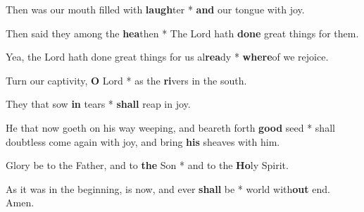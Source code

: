 \begin{multicols}{2}
	Then was our mouth filled with \textbf{laugh}ter * \textbf{and} our tongue with joy.
	
	Then said they among the \textbf{hea}then * The Lord hath \textbf{done} great things for them.
	
	Yea, the Lord hath done great things for us al\textbf{rea}dy * \textbf{where}of we rejoice.
	
	Turn our captivity, \textbf{O} Lord * as the \textbf{ri}vers in the south.
	
	They that sow \textbf{in} tears * \textbf{shall} reap in joy.
	
	He that now goeth on his way weeping, and beareth forth \textbf{good} seed * shall doubtless come again with joy, and bring \textbf{his} sheaves with him.
	
	Glory be to the Father, and to \textbf{the} Son * and to the \textbf{Ho}ly Spirit.
	
	As it was in the beginning, is now, and ever \textbf{shall} be * world with\textbf{out} end. Amen.
\end{multicols}